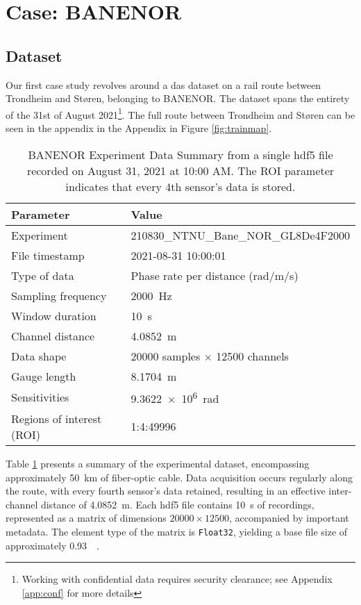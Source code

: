 \section{Case: BANENOR}

\subsection{Dataset}

Our first case study revolves around a \acrshort{das} dataset on a rail route between Trondheim and Støren, belonging to BANENOR. The dataset spans the entirety of the 31st of August 2021\footnote{Working with confidential data requires security clearance; see Appendix \ref{app:conf} for more details}. The full route between Trondheim and Støren can be seen in the appendix in the Appendix in Figure \ref{fig:trainmap}.
\begin{table}[!h]
    \centering
    \small
    \begin{tabular}{@{}p{}p{}@{}}
        \toprule
        \textbf{Parameter} & \textbf{Value} \\
        \midrule
        Experiment & 210830\_NTNU\_Bane\_NOR\_GL8De4F2000  \\
        File timestamp & 2021-08-31 10:00:01  \\
        Type of data & Phase rate per distance (rad/m/s) \\
        Sampling frequency & \qty{2000}{\hertz} \\
        Window duration & \qty{10}{\second} \\
        Channel distance & \qty{4.0852}{\meter} \\
        \midrule
        Data shape & 20000 samples \(\times\) 12500 channels  \\
        \midrule
        Gauge length & \qty{8.1704}{\meter} \\
        Sensitivities & \qty{9.3622e6}{\radian} \\
        Regions of interest (ROI) & 1:4:49996 \\
        \bottomrule
    \end{tabular}
    \caption{BANENOR Experiment Data Summary from a single \acrshort{hdf5} file recorded on August 31, 2021 at 10:00 AM. The ROI parameter indicates that every 4th sensor's data is stored.}
    \label{tab:experiment_data}
\end{table}

Table \ref{tab:experiment_data} presents a summary of the experimental dataset, encompassing approximately \qty{50}{\kilo\meter} of fiber-optic cable. Data acquisition occurs regularly along the route, with every fourth sensor's data retained, resulting in an effective inter-channel distance of \qty{4.0852}{\meter}. Each \acrshort{hdf5} file contains \qty{10}{\second} of recordings, represented as a matrix of dimensions $20000 \times 12500$, accompanied by important metadata. The element type of the matrix is \texttt{Float32}, yielding a base file size of approximately \qty{0.93}{\giga\byte}.

